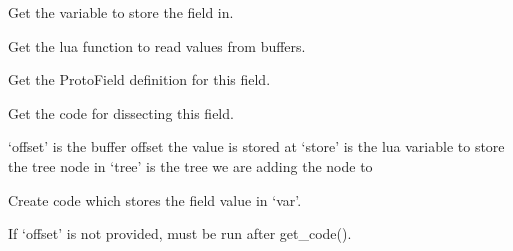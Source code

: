 \documentclass[A4paper,10pt,english]{sphinxmanual}
\begin{document}
\begin{fulllineitems}
\begin{fulllineitems}
\end{fulllineitems}


\begin{fulllineitems}
\label{devel/code:field.Field.variable}
Get the variable to store the field in.

\end{fulllineitems}


\begin{fulllineitems}
\label{devel/code:field.Field.func_type}
Get the lua function to read values from buffers.

\end{fulllineitems}


\begin{fulllineitems}
\label{devel/code:field.Field.get_definition}
Get the ProtoField definition for this field.

\end{fulllineitems}


\begin{fulllineitems}
\label{devel/code:field.Field.get_code}
Get the code for dissecting this field.

`offset' is the buffer offset the value is stored at
`store' is the lua variable to store the tree node in
`tree' is the tree we are adding the node to

\end{fulllineitems}


\begin{fulllineitems}
\label{devel/code:field.Field._store_value}
Create code which stores the field value in `var'.

If `offset' is not provided, must be run after get\_code().

\end{fulllineitems}


\end{fulllineitems}
\end{document}
